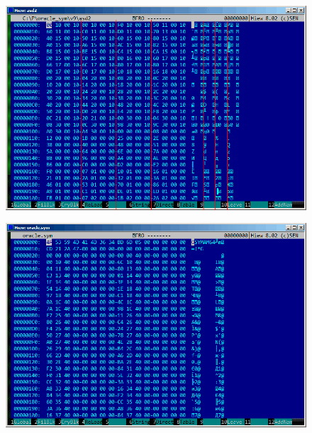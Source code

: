 \begin{figure}[H]
\centering
\includegraphics[scale=\FigScale]{ff/Oracle_SYM/binary2.png}
\caption{}
\label{fig:oracle_SYM_binary2}
\end{figure}

\begin{figure}[H]
\centering
\includegraphics[scale=\FigScale]{ff/Oracle_SYM/whole64.png}
\caption{}
\label{fig:oracle_SYM_whole64}
\end{figure}
